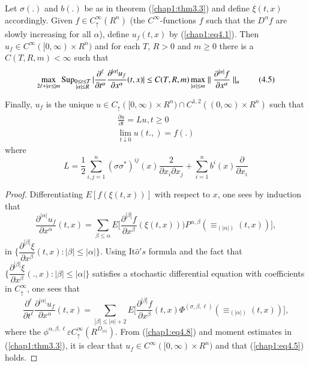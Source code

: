 \setcounter{lemma}{3}
\begin{lemma} %
Let $\sigma(.)$ and $b(.)$ be as in theorem (\ref{chap1:thm3.3}) and
define $\xi (t,x)$ accordingly. Given $f \in C ^\infty_\uparrow (R^n)$
(the $C^\infty$-functions $f$ such that the $D^\alpha f$ are slowly
increasing for all $\alpha$), define $u_f(t,x)$ by
(\ref{chap1:eq4.1}). Then $u_f 
\in C^\infty ([0, \infty ) \times R^n)$ and for each $T$, $R > 0$ and $m
  \geq 0 $ there is a $C(T,R,m)< \infty $ such that 
\begin{equation*}
\max_{2 \ell + |\alpha \leq |m }\operatorname{Sup}\limits_{\substack {0 \le t \le T\\{|\alpha |
      \le R}}}| \frac{\partial^\ell}{\partial
  t^\alpha} \frac{\partial^{|\alpha |}u_f}{\partial x^\alpha}(t,x)|
\leq C(T,R,m) 
    \max_{| \alpha | \leq m} \parallel \frac{\partial^{|\alpha
        |}f}{\partial x^\alpha}\parallel_u \tag{4.5}\label{chap1:eq4.5}     
\end{equation*}

Finally, $u_f$ is the unique $u \in C_\uparrow ([0,\infty) \times R^n)
  \cap C^{1,2}((0 , \infty ) \times R^n)$ such that
\begin{gather*}
\frac{\partial u}{\partial t} =Lu, t \geq 0 \tag{4.6}\label{chap1:eq4.6}  \\
\lim_{t \downarrow 0} u(t.,) = f(.)
\end{gather*}\pageoriginale
where
$$
L = \frac{1}{2} \sum^{n}_{i, j=1} (\sigma \sigma
^*)^{ij}(x)\frac{2}{\partial x_i \partial x_j}+ \sum^{n}_{i=1} b^i
(x)\frac{\partial}{\partial x_i} 
$$
\end{lemma}

\begin{proof}
Differentiating $E[f(\xi (t,x))]$ with respect to $x$, one sees by
induction that  
\begin{equation*}
\frac{\partial^{|\alpha|}u_f}{\partial x^\alpha}(t,x) = \sum_{\beta
  \leq \alpha }E \Bigg 
[\frac{\partial^{|\beta|}f}{\partial x^\beta}(\xi (t,x)))P^{\alpha ,
    \beta}( \equiv_{(| \alpha | )}(t,x))\Bigg ],
\tag{4.7}\label{chap1:eq4.7}      
\end{equation*}
in $\bigg \{ \dfrac{\partial^{|\beta|}\xi}{\partial x^\beta}(t,x):
|\beta | \leq |\alpha | \bigg \}$. Using It$\hat{o}'s$ formula and
the fact that \break
$\bigg \{ \dfrac{\partial^{|\beta|}\xi}{\partial
  x^\beta}(.,x): |\beta | \leq |\alpha | \bigg \}$ satisfies a
stochastic differential equation with coefficients in
$C^\infty_\uparrow$, one sees that  
\begin{equation*}
\frac{\partial^\ell}{\partial
  t^\ell}\frac{\partial^{|\alpha|}u_f}{\partial x^\alpha}(t,x) =
\sum_{| \beta |\leq | \alpha | +2 }E \Bigg 
[\frac{\partial^{|\beta|}f}{\partial x^\beta}(t,x) \Phi ^{(\sigma
    ,\beta ,\ell)}( \equiv_{(| \alpha | )}(t,x))\Bigg ],
\tag{4.8}\label{chap1:eq4.8}      
\end{equation*}
where the $\phi^{\alpha , \beta , \ell} \varepsilon C^\infty_\uparrow
(R^{D_{|\alpha |}})$. From (\ref{chap1:eq4.8}) and moment estimates in
(\ref{chap1:thm3.3}), it is clear that $u_f \in C^\infty ([ 0 , \infty )
  \times R^n)$ and that   (\ref{chap1:eq4.5}) holds.  
\end{proof}

